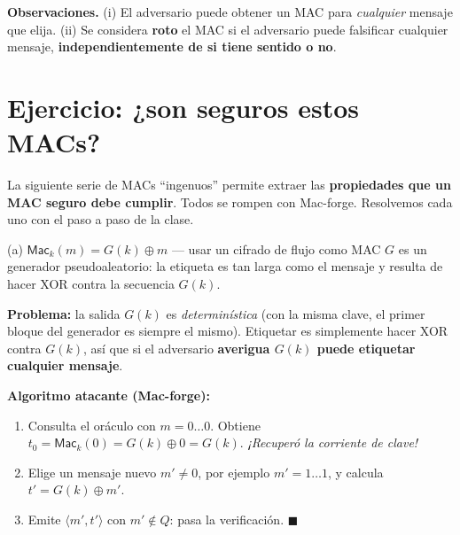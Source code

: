 \documentclass[11pt,a4paper]{article}
\newcommand{\xor}{\oplus}
\newcommand{\Mac}{\mathsf{Mac}}
\begin{document}
\begin{slidebox}
\textbf{Observaciones.} (i) El adversario puede obtener un MAC para \emph{cualquier} mensaje
que elija. (ii) Se considera \textbf{roto} el MAC si el adversario puede falsificar
cualquier mensaje, \textbf{independientemente de si tiene sentido o no}.
\end{slidebox}

\section{Ejercicio: ¿son seguros estos MACs?}

La siguiente serie de MACs ``ingenuos'' permite extraer las \textbf{propiedades que un MAC
seguro debe cumplir}. Todos se rompen con Mac-forge. Resolvemos cada uno con el paso a paso
de la clase.

\begin{practbox}{(a) $\Mac_k(m)=G(k)\xor m$ — usar un cifrado de flujo como MAC}
$G$ es un generador pseudoaleatorio: la etiqueta es tan larga como el mensaje y resulta de
hacer XOR contra la secuencia $G(k)$.

\medskip
\textbf{Problema:} la salida $G(k)$ es \emph{determinística} (con la misma clave, el primer
bloque del generador es siempre el mismo). Etiquetar es simplemente hacer XOR contra $G(k)$,
así que si el adversario \textbf{averigua $G(k)$ puede etiquetar cualquier mensaje}.

\medskip
\textbf{Algoritmo atacante (Mac-forge):}
\begin{enumerate}[leftmargin=1.6em,itemsep=1pt]
  \item Consulta el oráculo con $m=0\ldots0$. Obtiene $t_0=\Mac_k(0)=G(k)\xor 0=\boxed{G(k)}$.
        \emph{¡Recuperó la corriente de clave!}
  \item Elige un mensaje nuevo $m'\neq 0$, por ejemplo $m'=1\ldots1$, y calcula
        $t'=G(k)\xor m'$.
  \item Emite $\langle m', t'\rangle$ con $m'\notin Q$: pasa la verificación. $\blacksquare$
\end{enumerate}
\end{practbox}
\end{document}
